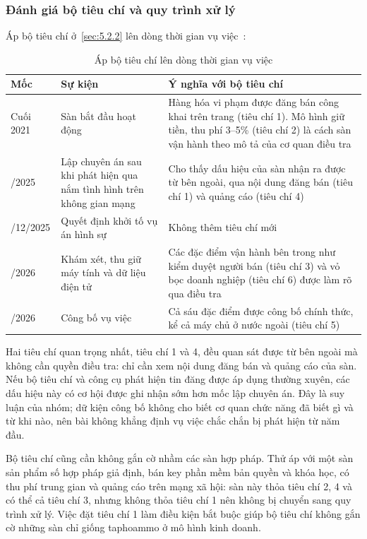 \subsubsection{Đánh giá bộ tiêu chí và quy trình xử lý}\label{sec:6.1.2}

Áp bộ tiêu chí ở~\ref{sec:5.2.2} lên dòng thời gian vụ việc~\cite{bca-2026}:

{\small{}
\begin{table}[H]
\centering
\caption{Áp bộ tiêu chí lên dòng thời gian vụ việc}\label{tab:6.13}
\begin{tabularx}{\textwidth}{>{\raggedright\arraybackslash}l>{\hsize=0.591\hsize\raggedright\arraybackslash}X>{\hsize=1.409\hsize\raggedright\arraybackslash}X}
\toprule
\textbf{Mốc} & \textbf{Sự kiện} & \textbf{Ý nghĩa với bộ tiêu chí} \\
\midrule
Cuối 2021 & Sàn bắt đầu hoạt động & Hàng hóa vi phạm được đăng bán công khai trên trang (tiêu chí 1). Mô hình giữ tiền, thu phí 3–5\% (tiêu chí 2) là cách sàn vận hành theo mô tả của cơ quan điều tra \\
6/2025 & Lập chuyên án sau khi phát hiện qua nắm tình hình trên không gian mạng & Cho thấy dấu hiệu của sàn nhận ra được từ bên ngoài, qua nội dung đăng bán (tiêu chí 1) và quảng cáo (tiêu chí 4) \\
25/12/2025 & Quyết định khởi tố vụ án hình sự & Không thêm tiêu chí mới \\
2/2026 & Khám xét, thu giữ máy tính và dữ liệu điện tử & Các đặc điểm vận hành bên trong như kiểm duyệt người bán (tiêu chí 3) và vỏ bọc doanh nghiệp (tiêu chí 6) được làm rõ qua điều tra \\
7/2026 & Công bố vụ việc & Cả sáu đặc điểm được công bố chính thức, kể cả máy chủ ở nước ngoài (tiêu chí 5) \\
\bottomrule
\end{tabularx}
\end{table}}

Hai tiêu chí quan trọng nhất, tiêu chí 1 và 4, đều quan sát được từ bên ngoài mà không cần quyền điều tra: chỉ cần xem nội dung đăng bán và quảng cáo của sàn. Nếu bộ tiêu chí và công cụ phát hiện tin đăng được áp dụng thường xuyên, các dấu hiệu này có cơ hội được ghi nhận sớm hơn mốc lập chuyên án. Đây là suy luận của nhóm; dữ kiện công bố không cho biết cơ quan chức năng đã biết gì và từ khi nào, nên bài không khẳng định vụ việc chắc chắn bị phát hiện từ năm đầu.

Bộ tiêu chí cũng cần không gắn cờ nhầm các sàn hợp pháp. Thử áp với một sàn sản phẩm số hợp pháp giả định, bán key phần mềm bản quyền và khóa học, có thu phí trung gian và quảng cáo trên mạng xã hội: sàn này thỏa tiêu chí 2, 4 và có thể cả tiêu chí 3, nhưng không thỏa tiêu chí 1 nên không bị chuyển sang quy trình xử lý. Việc đặt tiêu chí 1 làm điều kiện bắt buộc giúp bộ tiêu chí không gắn cờ những sàn chỉ giống taphoammo ở mô hình kinh doanh.

